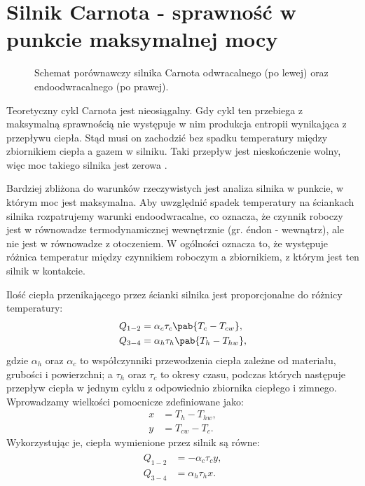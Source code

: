 
\section{Silnik Carnota - sprawność w punkcie maksymalnej mocy}
\begin{figure}[h]
	\centering
	
	\caption{Schemat porównawczy silnika Carnota odwracalnego (po lewej) oraz endoodwracalnego (po prawej).}
\end{figure}
Teoretyczny cykl Carnota jest nieosiągalny. Gdy cykl ten przebiega z maksymalną sprawnością nie występuje w nim produkcja entropii wynikająca z przepływu ciepła. Stąd musi on zachodzić bez spadku temperatury między zbiornikiem ciepła a gazem w silniku. Taki przepływ jest nieskończenie wolny, więc moc takiego silnika jest zerowa \cite{curzon}.

Bardziej zbliżona do warunków rzeczywistych jest analiza silnika w punkcie, w którym moc jest maksymalna. Aby uwzględnić spadek temperatury na ściankach silnika rozpatrujemy warunki endoodwracalne, co oznacza, że czynnik roboczy jest w równowadze termodynamicznej wewnętrznie (gr. \'{e}ndon - wewnątrz), ale nie jest w równowadze z otoczeniem. W ogólności oznacza to, że występuje różnica temperatur między czynnikiem roboczym a zbiornikiem, z którym jest ten silnik w kontakcie.

Ilość ciepła przenikającego przez ścianki silnika jest proporcjonalne do różnicy temperatury:
\begin{gather}
\begin{split}
	Q_{1-2} &= \alpha_{c}\tau_{c}\pab{T_{c} - T_{cw}}, \\
	Q_{3-4} &= \alpha_{h}\tau_{h}\pab{T_{h} - T_{hw}},
\end{split}
\end{gather}
gdzie \(\alpha_{h}\) oraz \(\alpha_{c}\) to współczynniki przewodzenia ciepła zależne od materiału, grubości i powierzchni; a \(\tau_{h}\) oraz \(\tau_{c}\) to okresy czasu, podczas których następuje przepływ ciepła w jednym cyklu z odpowiednio zbiornika ciepłego i zimnego. Wprowadzamy wielkości pomocnicze zdefiniowane jako:
\begin{align}
	x &= T_h - T_{hw}, \\
	y &= T_{cw} - T_c.
\end{align}
Wykorzystując je, ciepła wymienione przez silnik są równe:
\begin{gather}\label{eq:endo_carnot_Q}
	\begin{split}
		Q_{1-2} &=  - \alpha_{c}\tau_{c}y, \\
		Q_{3-4} &=    \alpha_{h}\tau_{h}x.
	\end{split}
\end{gather}

